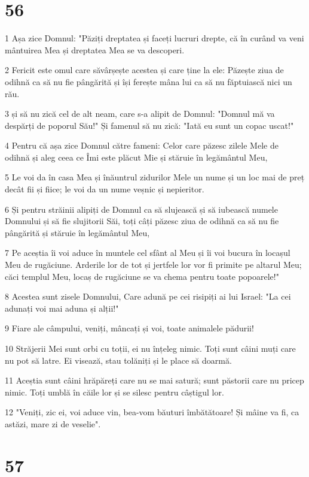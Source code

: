 \chapter{56}

\par 1 Așa zice Domnul: "Păziți dreptatea și faceți lucruri drepte, că în curând va veni mântuirea Mea și dreptatea Mea se va descoperi.
\par 2 Fericit este omul care săvârșește acestea și care ține la ele: Păzește ziua de odihnă ca să nu fie pângărită și își ferește mâna lui ca să nu făptuiască nici un rău.
\par 3 și să nu zică cel de alt neam, care s-a alipit de Domnul: "Domnul mă va despărți de poporul Său!" Și famenul să nu zică: "Iată eu sunt un copac uscat!"
\par 4 Pentru că așa zice Domnul către fameni: Celor care păzesc zilele Mele de odihnă și aleg ceea ce Îmi este plăcut Mie și stăruie în legământul Meu,
\par 5 Le voi da în casa Mea și înăuntrul zidurilor Mele un nume și un loc mai de preț decât fii și fiice; le voi da un nume veșnic și nepieritor.
\par 6 Și pentru străinii alipiți de Domnul ca să slujească și să iubească numele Domnului și să fie slujitorii Săi, toți câți păzesc ziua de odihnă ca să nu fie pângărită și stăruie în legământul Meu,
\par 7 Pe aceștia îi voi aduce în muntele cel sfânt al Meu și îi voi bucura în locașul Meu de rugăciune. Arderile lor de tot și jertfele lor vor fi primite pe altarul Meu; căci templul Meu, locaș de rugăciune se va chema pentru toate popoarele!"
\par 8 Acestea sunt zisele Domnului, Care adună pe cei risipiți ai lui Israel: "La cei adunați voi mai aduna și alții!"
\par 9 Fiare ale câmpului, veniți, mâncați și voi, toate animalele pădurii!
\par 10 Străjerii Mei sunt orbi cu toții, ei nu înțeleg nimic. Toți sunt câini muți care nu pot să latre. Ei visează, stau tolăniți și le place să doarmă.
\par 11 Aceștia sunt câini hrăpăreți care nu se mai satură; sunt păstorii care nu pricep nimic. Toți umblă în căile lor și se silesc pentru câștigul lor.
\par 12 "Veniți, zic ei, voi aduce vin, bea-vom băuturi îmbătătoare! Și mâine va fi, ca astăzi, mare zi de veselie".

\chapter{57}


